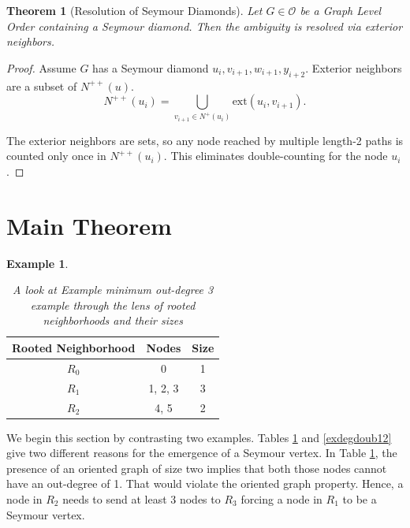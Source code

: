 \documentclass[AMS, Times1COL]{article} %
\newtheorem{theorem}{Theorem}[section]
\theoremstyle{definition}
\newtheorem{example}{Example}[section]
\begin{document}
	
	\begin{theorem}[Resolution of Seymour Diamonds]
		Let $G \in \mathcal{O}$ be a Graph Level Order containing a Seymour diamond. Then the ambiguity is resolved via exterior neighbors. \end{theorem}\label{smdiam}
	
	\begin{proof}
		Assume $G$ has a Seymour diamond $u_i, v_{i+1}, w_{i+1},y_{i+2}$.
		Exterior neighbors are a subset of $N^{++}(u)$. 
		$$N^{++}(u_i) = \bigcup_{v_{i+1} \in {N^+(u_i)}} \text{ext}(u_i, v_{i+1}).$$
		
		The exterior neighbors are sets, so any node reached by multiple length-2 paths is counted only once in $N^{++}(u_i)$.
		This eliminates double-counting for the node $u_i$.
	\end{proof}
	
	
	\section{Main Theorem} \label{main}
	
	\begin{example}
		\begin{table}[h!]
			\centering
			\begin{tabular}{|c|c|c|}
				\hline
				\textbf{Rooted Neighborhood} & \textbf{Nodes} & \textbf{Size} \\
				\hline
				$R_0$ & 0 & 1 \\
				$R_1$ & 1, 2, 3 & 3 \\
				$R_2$ & 4, 5 & 2 \\
				\hline
			\end{tabular}
			\caption{\textit{A look at Example minimum out-degree 3 example through the lens of rooted neighborhoods and their sizes}} \label{exdegdoub2}
		\end{table}
	\end{example}
	
	We begin this section by contrasting two examples. Tables \ref{exdegdoub2} and \ref{exdegdoub12} give two different reasons for the emergence of a Seymour vertex. In Table \ref{exdegdoub2}, the presence of an oriented graph of size two implies that both those nodes cannot have an out-degree of 1. That would violate the oriented graph property. Hence, a node in $R_2$ needs to send at least 3 nodes to $R_3$ forcing a node in $R_1$ to be a Seymour vertex.
	
\end{document}
